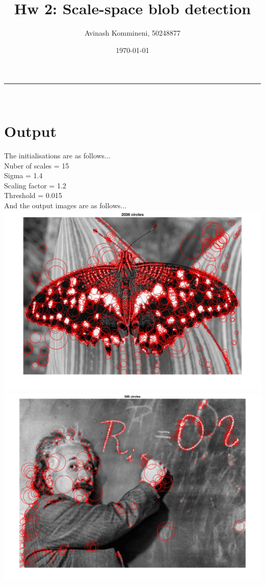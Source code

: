\documentclass[a4paper,11pt]{article}
\makeatletter
\newcommand{\linia}{\rule{\linewidth}{0.5pt}}
\renewcommand{\maketitle}{
\begin{center}
\vspace{1ex}
{\LARGE \textsc{\@title}}
\vspace{0.5ex}
\linia\\
\@author \hfill \@date
\vspace{3ex}
\end{center}
}
\makeatother
\begin{document}
\title{Hw 2: Scale-space blob detection}

\author{Avinash Kommineni, 50248877} 
\date{\today}

\maketitle

\section*{Output}

The initialisations are as follows...\\
Nuber of scales = 15\\
Sigma = 1.4\\
Scaling factor = 1.2\\
Threshold = 0.015\\
And the output images are as follows...\\
\includegraphics[width=\textwidth]{hw2/code/1}\\
\includegraphics[width=\textwidth]{hw2/code/2}\\
\end{document}
